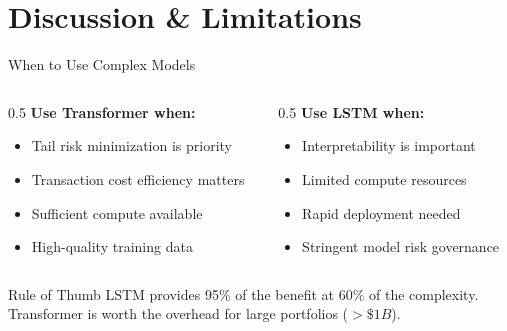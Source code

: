 \documentclass[aspectratio=169,11pt]{beamer}
\begin{document}
\section{Discussion \& Limitations}

\begin{frame}{When to Use Complex Models}
\begin{columns}
\begin{column}{0.5\textwidth}
\textbf{Use Transformer when:}
\begin{itemize}
    \item Tail risk minimization is priority
    \item Transaction cost efficiency matters
    \item Sufficient compute available
    \item High-quality training data
\end{itemize}
\end{column}
\begin{column}{0.5\textwidth}
\textbf{Use LSTM when:}
\begin{itemize}
    \item Interpretability is important
    \item Limited compute resources
    \item Rapid deployment needed
    \item Stringent model risk governance
\end{itemize}
\end{column}
\end{columns}

\vspace{0.5cm}
\begin{block}{Rule of Thumb}
LSTM provides 95\% of the benefit at 60\% of the complexity.\\
Transformer is worth the overhead for large portfolios ($>\$1B$).
\end{block}
\end{frame}
\end{document}
